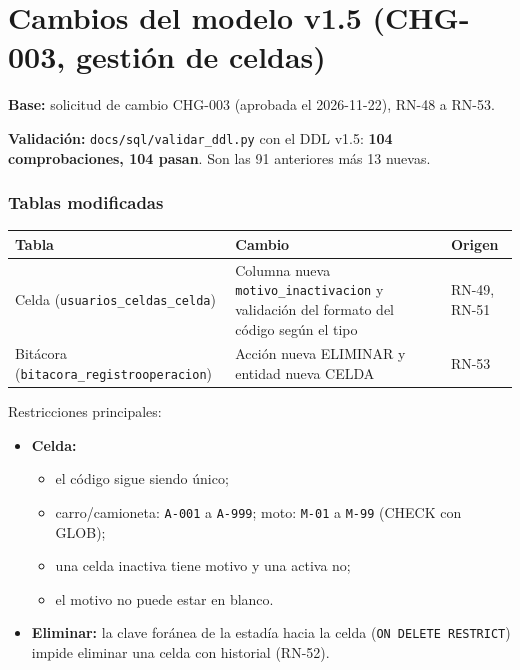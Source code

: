 \section{Cambios del modelo v1.5 (CHG-003, gestión de celdas)}
\textbf{Base:} solicitud de cambio CHG-003 (aprobada el 2026-11-22), RN-48 a RN-53.

\textbf{Validación:} \texttt{docs/sql/validar\_ddl.py} con el DDL v1.5: \textbf{104 comprobaciones, 104 pasan}. Son las 91 anteriores más 13 nuevas.


\subsubsection{Tablas modificadas}

\begin{longtable}{>{\raggedright\arraybackslash}p{5.6000000000000005cm}>{\raggedright\arraybackslash}p{7.3cm}>{\raggedright\arraybackslash}p{1.5cm}}
\toprule
\textbf{Tabla} & \textbf{Cambio} & \textbf{Origen}\\
\midrule\endhead
Celda (\texttt{usuarios\_celdas\_celda}) & Columna nueva \texttt{motivo\_inactivacion} y validación del formato del código según el tipo & RN-49, RN-51\\
Bitácora (\texttt{bitacora\_registrooperacion}) & Acción nueva ELIMINAR y entidad nueva CELDA & RN-53\\
\bottomrule
\end{longtable}


Restricciones principales:


\begin{itemize}
  \item \textbf{Celda:}
  \begin{itemize}\item el código sigue siendo único;\end{itemize}
  \begin{itemize}\item carro/camioneta: \texttt{A-001} a \texttt{A-999}; moto: \texttt{M-01} a \texttt{M-99} (CHECK con GLOB);\end{itemize}
  \begin{itemize}\item una celda inactiva tiene motivo y una activa no;\end{itemize}
  \begin{itemize}\item el motivo no puede estar en blanco.\end{itemize}
  \item \textbf{Eliminar:} la clave foránea de la estadía hacia la celda (\texttt{ON DELETE RESTRICT}) impide eliminar una celda con historial (RN-52).
\end{itemize}

